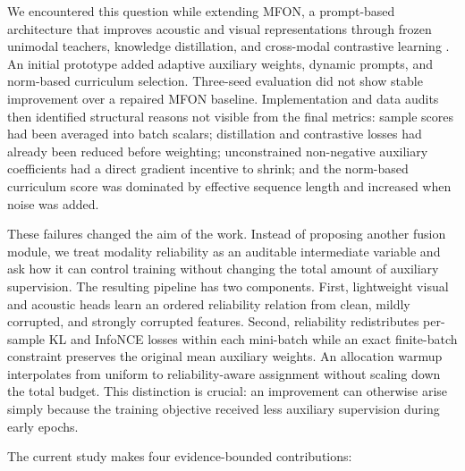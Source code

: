 We encountered this question while extending MFON, a prompt-based
architecture that improves acoustic and visual representations through
frozen unimodal teachers, knowledge distillation, and cross-modal
contrastive learning \cite{zhang2025mfon}. An initial prototype added
adaptive auxiliary weights, dynamic prompts, and norm-based curriculum
selection. Three-seed evaluation did not show stable improvement over a
repaired MFON baseline. Implementation and data audits then identified
structural reasons not visible from the final metrics: sample scores had
been averaged into batch scalars; distillation and contrastive losses
had already been reduced before weighting; unconstrained non-negative
auxiliary coefficients had a direct gradient incentive to shrink; and
the norm-based curriculum score was dominated by effective sequence
length and increased when noise was added.

These failures changed the aim of the work. Instead of proposing another
fusion module, we treat modality reliability as an auditable
intermediate variable and ask how it can control training without
changing the total amount of auxiliary supervision. The resulting
pipeline has two components. First, lightweight visual and acoustic
heads learn an ordered reliability relation from clean, mildly
corrupted, and strongly corrupted features. Second, reliability
redistributes per-sample KL and InfoNCE losses within each mini-batch
while an exact finite-batch constraint preserves the original mean
auxiliary weights. An allocation warmup interpolates from uniform to
reliability-aware assignment without scaling down the total budget. This
distinction is crucial: an improvement can otherwise arise simply
because the training objective received less auxiliary supervision
during early epochs.

The current study makes four evidence-bounded contributions:

